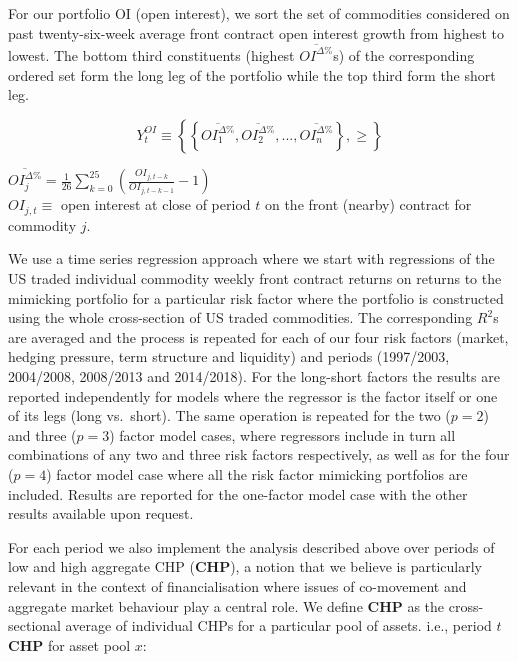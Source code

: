 \documentclass[
  authoryear,
  preprint,
  3p]{elsarticle}
\begin{document}
\medskip

For our portfolio OI (open interest), we sort the set of commodities
considered on past twenty-six-week average front contract open interest
growth from highest to lowest. The bottom third constituents (highest
\(\overline{OI^{\Delta \%}}\)s) of the corresponding ordered set form
the long leg of the portfolio while the top third form the short leg.

\[Y_{t}^{OI}\equiv\left \{ \left \{ \overline{{OI}_{1}^{\Delta \%}}, \overline{{OI}_{2}^{\Delta \%}}, ..., \overline{{OI}_{n}^{\Delta \%}} \right \}, \geq \right \}\]

\(\overline{{OI}_{j}^{\Delta \%}}=\frac{1}{26}\sum_{k=0}^{25}(\frac{{OI}_{j,t-k}}{{OI}_{j,t-k-1}} - 1)\)\\
\(OI_{j,t}\equiv\) open interest at close of period \(t\) on the front
(nearby) contract for commodity \(j\).

\medskip

We use a time series regression approach where we start with regressions
of the US traded individual commodity weekly front contract returns on
returns to the mimicking portfolio for a particular risk factor where
the portfolio is constructed using the whole cross-section of US traded
commodities. The corresponding \(R^{2}\)s are averaged and the process
is repeated for each of our four risk factors (market, hedging pressure,
term structure and liquidity) and periods (1997/2003, 2004/2008,
2008/2013 and 2014/2018). For the long-short factors the results are
reported independently for models where the regressor is the factor
itself or one of its legs (long vs.~short). The same operation is
repeated for the two (\(p=2\)) and three (\(p=3\)) factor model cases,
where regressors include in turn all combinations of any two and three
risk factors respectively, as well as for the four (\(p=4\)) factor
model case where all the risk factor mimicking portfolios are included.
Results are reported for the one-factor model case with the other
results available upon request.

\medskip

For each period we also implement the analysis described above over
periods of low and high aggregate CHP (\textbf{CHP}), a notion that we
believe is particularly relevant in the context of financialisation
where issues of co-movement and aggregate market behaviour play a
central role. We define \textbf{CHP} as the cross-sectional average of
individual CHPs for a particular pool of assets. i.e., period \(t\)
\textbf{CHP} for asset pool \(x\):
\end{document}
